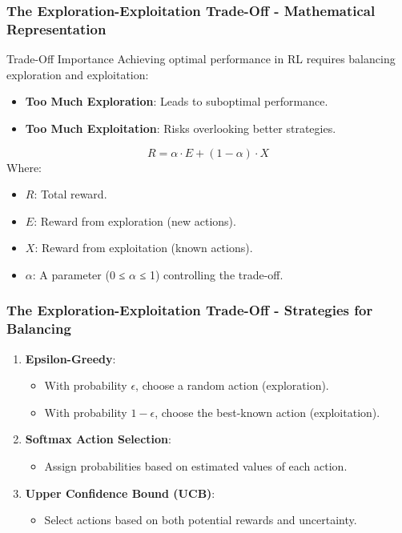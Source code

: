 \documentclass[aspectratio=169]{beamer}
\begin{document}
\begin{frame}[fragile]
    \frametitle{The Exploration-Exploitation Trade-Off - Mathematical Representation}
    \begin{block}{Trade-Off Importance}
        Achieving optimal performance in RL requires balancing exploration and exploitation:
        \begin{itemize}
            \item \textbf{Too Much Exploration}: Leads to suboptimal performance.
            \item \textbf{Too Much Exploitation}: Risks overlooking better strategies.
        \end{itemize}
    \end{block}

    \begin{equation}
    R = \alpha \cdot E + (1 - \alpha) \cdot X
    \end{equation}
    Where:
    \begin{itemize}
        \item \( R \): Total reward.
        \item \( E \): Reward from exploration (new actions).
        \item \( X \): Reward from exploitation (known actions).
        \item \( \alpha \): A parameter (0 ≤ \( \alpha \) ≤ 1) controlling the trade-off.
    \end{itemize}
\end{frame}

\begin{frame}[fragile]
    \frametitle{The Exploration-Exploitation Trade-Off - Strategies for Balancing}
    \begin{enumerate}
        \item \textbf{Epsilon-Greedy}:
        \begin{itemize}
            \item With probability \( \epsilon \), choose a random action (exploration).
            \item With probability \( 1 - \epsilon \), choose the best-known action (exploitation).
        \end{itemize}
        
        \item \textbf{Softmax Action Selection}:
        \begin{itemize}
            \item Assign probabilities based on estimated values of each action.
        \end{itemize}
        
        \item \textbf{Upper Confidence Bound (UCB)}:
        \begin{itemize}
            \item Select actions based on both potential rewards and uncertainty.
        \end{itemize}
    \end{enumerate}
\end{frame}
\end{document}
